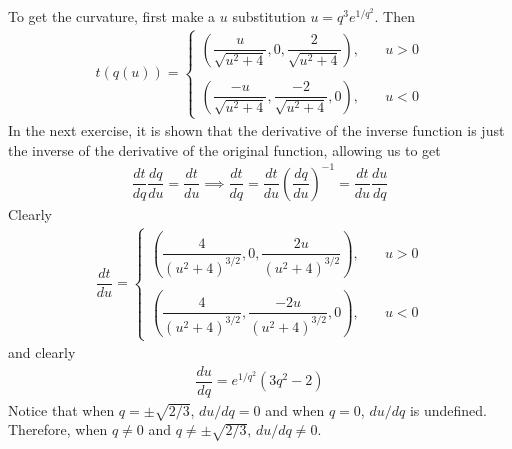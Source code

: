 \documentclass{article}
\begin{document}
	To get the curvature, first make a $u$ substitution $u = q^3 e^{1/q^2}$. Then
	\begin{gather*}
		t(q(u)) = \begin{cases}
			\left( \dfrac{ u }{ \sqrt{ u^2 + 4 } }, 0, \dfrac{2}{ \sqrt{ u^2 + 4 } } \right), \quad &u > 0
			\\ \\
			\left( \dfrac{-u }{ \sqrt{ u^2 + 4 } }, \dfrac{-2}{ \sqrt{ u^2 + 4 } }, 0 \right), \quad &u < 0
		\end{cases}
	\end{gather*}
	In the next exercise, it is shown that the derivative of the inverse function is just the inverse of the derivative of the original function, allowing us to get
	\begin{gather*}
		\dfrac{dt}{dq} \dfrac{dq}{du} = \dfrac{dt}{du} \implies \dfrac{dt}{dq} = \dfrac{dt}{du} \left( \dfrac{dq}{du} \right)^{-1} = \dfrac{dt}{du} \dfrac{du}{dq}
	\end{gather*}
	Clearly
	\begin{gather*}
		\dfrac{dt}{du} = \begin{cases}
			\left( \dfrac{ 4 }{ ( u^2 + 4 )^{3/2} }, 0, \dfrac{ 2u }{ ( u^2 + 4 )^{3/2} } \right), \quad &u > 0
			\\ \\
			\left( \dfrac{ 4 }{ ( u^2 + 4 )^{3/2} }, \dfrac{ -2u }{ ( u^2 + 4 )^{3/2} }, 0 \right), \quad &u < 0
		\end{cases}
	\end{gather*}
	and clearly
	\begin{gather*}
		\dfrac{du}{dq} = e^{1/q^2} (3q^2 - 2)
	\end{gather*}
	Notice that when $q = \pm \sqrt{2/3}$, $du/dq = 0$ and when $q = 0$, $du/dq$ is undefined. Therefore, when $q \neq 0$ and $q \neq \pm \sqrt{2/3}$, $du/dq \neq 0$.
	
\end{document}
